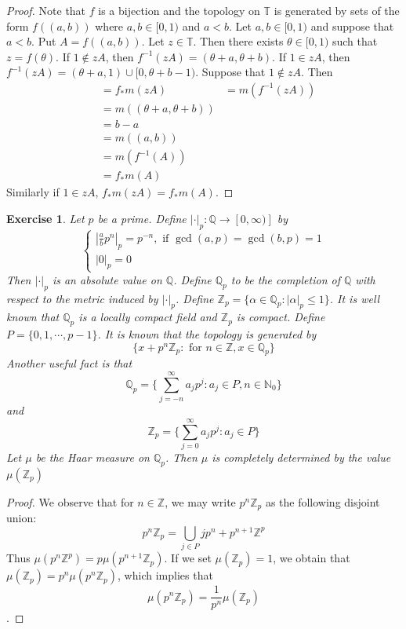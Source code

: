 \documentclass[12pt]{amsart}
\newtheorem{ex}[thm]{Exercise}
\newcommand{\al}{\alpha}
\newcommand{\N}{\mathbb{N}}
\newcommand{\Z}{\mathbb{Z}}
\newcommand{\T}{\mathbb{T}}
\newcommand{\Q}{\mathbb{Q}}
\begin{document}
	\begin{proof}
		Note that $f$ is a bijection and the topology on $\T$ is generated by sets of the form $f((a, b))$ where $a,b \in [0,1)$ and $a< b$. Let $a,b \in [ 0,1 )$ and suppose that $a<b$. Put $A = f((a, b))$. Let $z \in \T$. Then there exists $\theta \in [0, 1)$ such that $z = f(\theta)$. If $1 \not \in zA$, then $f^{-1}(zA) = (\theta + a, \theta + b)$. If $1 \in zA$, then $f^{-1}(zA) = (\theta + a , 1) \cup [0,  \theta + b - 1)$. Suppose that $1 \not \in zA$. Then
		\begin{align*}
			& = f_*m(zA) 
			& = m(f^{-1}(zA)) \\
			& = m((\theta + a, \theta + b)) \\
			& = b - a \\
			& = m((a,b)) \\
			& = m(f^{-1}(A)) \\
			& = f_*m(A)
		\end{align*}
	Similarly if $1 \in zA$, $f_*m(zA) = f_*m(A)$.
	\end{proof} 

	\begin{ex}
		Let $p$ be a prime. Define $|\cdot |_p: \Q \rightarrow [0, \infty)]$ by 
		\[
		\begin{cases}
			|\frac{a}{b}p^n|_p = p^{-n}, \text{ if } \gcd(a,p) = \gcd(b,p) = 1 \\
			|0|_p = 0
		\end{cases}
		\]
		Then $|\cdot|_p$ is an absolute value on $\Q$. Define $\Q_p$ to be the completion of $\Q$ with respect to the metric induced by $|\cdot|_p$. Define $\Z_p = \{\al \in \Q_p: |\al|_p \leq 1 \}$. It is well known that $\Q_p$ is a locally compact field and $\Z_p$ is compact. Define $P = \{0, 1, \cdots, p-1\}$. It is known that the topology is generated by  $$\{x + p^n\Z_p: \text{ for } n \in \Z, x \in \Q_p\}$$ Another useful fact is that $$\Q_p = \{\sum_{j = -n}^{\infty} a_jp^j : a_j \in P, n \in \N_0\}$$ and $$\Z_p = \{\sum_{j = 0}^{\infty} a_jp^j : a_j \in P\}$$ 
		Let $\mu$ be the Haar measure on $\Q_p$. Then $\mu$ is completely determined by the value $\mu(\Z_p)$  
	\end{ex}

	\begin{proof}
		We observe that for $n \in \Z$, we may write $p^n \Z_p$ as the following disjoint union: $$p^n\Z_p = \bigcup\limits_{j \in P} jp^n + p^{n+1}\Z^p$$ Thus $\mu(p^n \Z^{p}) = p \mu(p^{n+1}\Z_p)$. If we set $\mu(\Z_p) = 1$, we obtain that $\mu(\Z_p) = p^n \mu(p^n\Z_p)$, which implies that $$\mu(p^n \Z_p) = \frac{1}{p^n}\mu(\Z_p)$$.  
	\end{proof}
	
\end{document}
